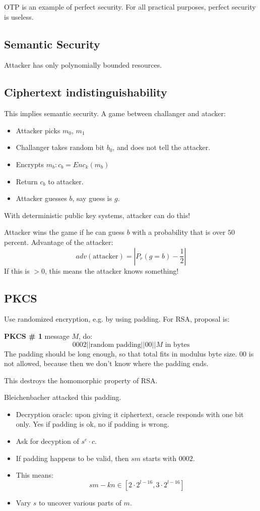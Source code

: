 \documentclass[language=english,number=]{homework}
\begin{document}
    OTP is an example of perfect security.
    For all practical purposes, perfect security is useless.

    \subsection{Semantic Security}

    Attacker has only polynomially bounded resources.

    \subsection{Ciphertext indistinguishability}

    This implies semantic security.
    A game between challanger and atacker:
    \begin{itemize}
        \item Attacker picks $m_0$, $m_1$
        \item Challanger takes random bit $b_0$, and does not tell the attacker.
        \item Encrypts $m_b: c_b = Enc_k(m_b)$
        \item Return $c_b$ to attacker.
        \item Attacker guesses $b$, say guess is $g$.
    \end{itemize}

    With deterministic public key systems, attacker can do this!

    Attacker wins the game if he can guess $b$ with a probability that is over $50$ percent.
    Advantage of the attacker:
    \[
        adv(\text{attacker}) = |P_r(g=b) - \frac{1}{2}|
    \]
    If this is $>0$, this means the attacker knows something!

    \subsection{PKCS}
    Use randomized encryption, e.g. by using padding.
    For RSA, proposal is:

    \textbf{PKCS \# 1} message $M$, do:
    \[
        0002 || \text{random padding}||00||M \text{ in bytes}
    \]
    The padding should be long enough, so that total fits in modulus byte size.
    00 is not allowed, because then we don't know where the padding ends.

    This destroys the homomorphic property of RSA.

    Bleichenbacher attacked this padding.
    \begin{itemize}
        \item Decryption oracle: upon giving it ciphertext, oracle responds with one bit only.
        Yes if padding is ok, no if padding is wrong.
        \item Ask for decyption of $s^e \cdot c$.
        \item If padding happens to be valid, then $sm$ starts with $0002$.
        \item This means:
        \[
            sm - kn \in [2 \cdot 2^{l-16}, 3 \cdot 2^{l-16}]
        \]
        \item Vary $s$ to uncover various parts of $m$.
    \end{itemize}
\end{document}
